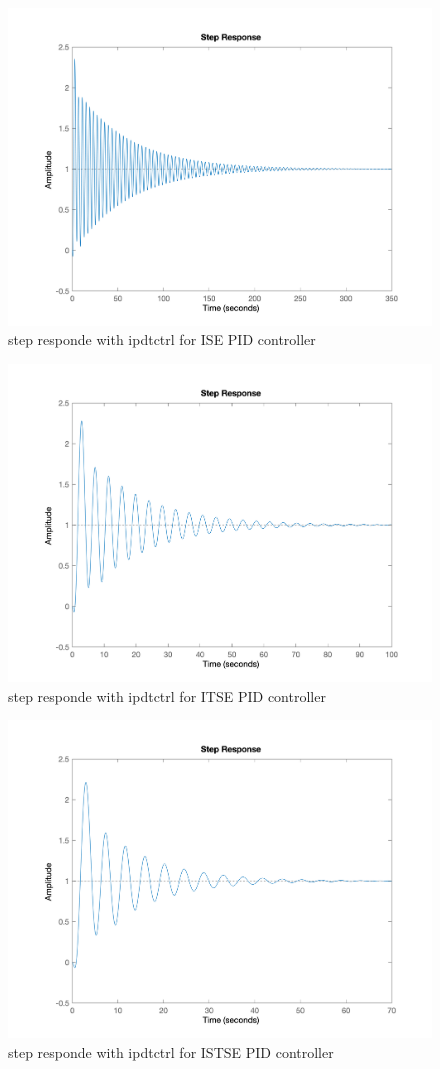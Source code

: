 \begin{figure}[H]
    \caption{step responde with ipdtctrl for ISE PID controller}
    \centering
    \includegraphics[width=12cm]{../Figure/Q2/pid1.png}
\end{figure}
\begin{figure}[H]
    \caption{step responde with ipdtctrl for ITSE PID controller}
    \centering
    \includegraphics[width=12cm]{../Figure/Q2/pid2.png}
\end{figure}
\begin{figure}[H]
    \caption{step responde with ipdtctrl for ISTSE PID controller}
    \centering
    \includegraphics[width=12cm]{../Figure/Q2/pid3.png}
\end{figure}

